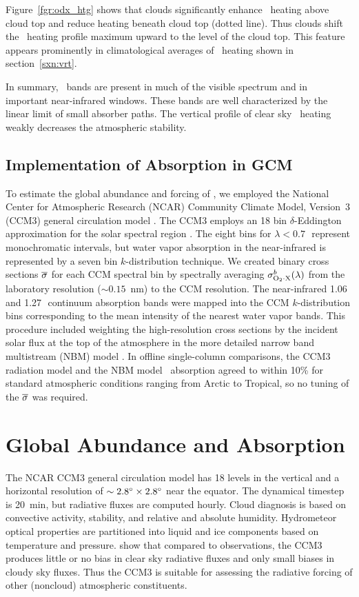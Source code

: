 \documentclass[agupp,twoside]{aguplus} %
\begin{document}
Figure~\ref{fgr:odx_htg} shows that clouds significantly enhance
\OdX\ heating above cloud top and reduce heating beneath cloud top
(dotted line).  
Thus clouds shift the \OdX\ heating profile maximum upward to the
level of the cloud top.
This feature appears prominently in climatological averages of \OdX\
heating shown in section~\ref{sxn:vrt}.

In summary, \OdX\ bands are present in much of the visible spectrum 
and in important near-infrared windows.
These bands are well characterized by the linear limit of small
absorber paths. 
The vertical profile of clear sky \OdX\ heating weakly decreases
the atmospheric stability. 

\subsection{Implementation of Absorption in GCM}
To estimate the global abundance and forcing of \OdX, we employed 
the National Center for Atmospheric Research (NCAR) Community Climate
Model, Version~3 (CCM3) general circulation model \cite[]{KHB98}.
The {CCM3} employs an 18 bin $\delta$-Eddington approximation for the 
solar spectral region \cite[]{Bri921}.   
The eight bins for $\lambda < 0.7$\,\um\ represent monochromatic
intervals, but water vapor absorption in the near-infrared is
represented by a seven bin $k$-distribution technique.
We created binary cross sections $\overline{\sigma}$ for each CCM spectral
bin by spectrally averaging $\sigma^{b}_{\mathrm{O}_{2} \cdot \mathrm{X}}(\lambda)$ from the laboratory
resolution ($\sim 0.15$~nm) to the CCM resolution.  
The near-infrared 1.06 and 1.27\,\um\ continuum absorption bands were
mapped into the CCM $k$-distribution bins corresponding to the mean
intensity of the nearest water vapor bands.
This procedure included weighting the high-resolution cross sections
by the incident solar flux at the top of the atmosphere in the more
detailed narrow band multistream (NBM) model \cite[]{ZBP97}.  
In offline single-column comparisons, the CCM3 radiation model
and the NBM model \OdX\ absorption agreed to within 10\% for
standard atmospheric conditions ranging from Arctic to Tropical, so no
tuning of the $\overline{\sigma}$ was required.  

\section{Global Abundance and Absorption}\label{sxn:res} 

The NCAR CCM3 general circulation model \cite[]{KHB98} has 18 levels
in the vertical and a horizontal resolution of $\sim 2.8^{\circ}
\times 2.8^{\circ}$ near the equator.   
The dynamical timestep is 20~min, but radiative fluxes are computed 
hourly. 
Cloud diagnosis is based on convective activity, stability, and
relative and absolute humidity.
Hydrometeor optical properties are partitioned into liquid and ice
components based on temperature and pressure.  
\cite{KHH98} show that compared to observations, the CCM3 produces 
little or no bias in clear sky radiative fluxes and only small biases
in cloudy sky fluxes. 
Thus the CCM3 is suitable for assessing the radiative forcing of other
(noncloud) atmospheric constituents.
\end{document}
